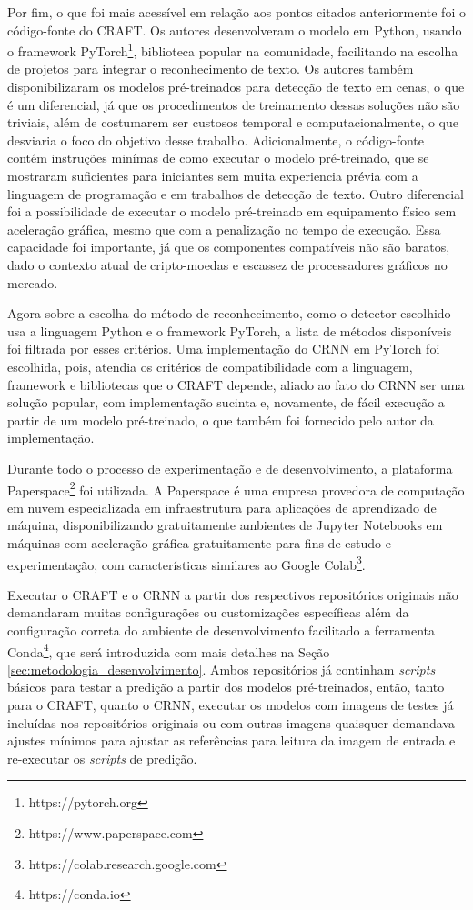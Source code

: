 Por fim, o que foi mais acessível em relação aos pontos citados anteriormente foi o código-fonte do CRAFT. Os autores desenvolveram o modelo em 
Python, usando o framework PyTorch\footnote{https://pytorch.org}, biblioteca popular na comunidade, facilitando na escolha de projetos para 
integrar o reconhecimento de texto. Os autores também disponibilizaram os modelos pré-treinados para detecção de texto em cenas, o que é um diferencial, 
já que os procedimentos de treinamento dessas soluções não são triviais, além de costumarem ser custosos temporal e computacionalmente, o que desviaria o foco do objetivo desse trabalho. 
Adicionalmente, o código-fonte contém instruções minímas de como executar o modelo pré-treinado, que se mostraram suficientes para iniciantes 
sem muita experiencia prévia com a linguagem de programação e em trabalhos de detecção de texto. Outro diferencial foi a possibilidade de executar 
o modelo pré-treinado em equipamento físico sem aceleração gráfica, mesmo que com a penalização no tempo de execução. 
Essa capacidade foi importante, já que os componentes compatíveis não são baratos, dado o contexto atual de cripto-moedas e escassez de processadores gráficos no mercado.

Agora sobre a escolha do método de reconhecimento, como o detector escolhido usa a linguagem Python e o framework PyTorch, a lista de métodos 
disponíveis foi filtrada por esses critérios. Uma implementação do CRNN em PyTorch foi escolhida, pois, atendia os critérios de compatibilidade 
com a linguagem, framework e bibliotecas que o CRAFT depende, aliado ao fato do CRNN ser uma solução popular, com implementação sucinta e, 
novamente, de fácil execução a partir de um modelo pré-treinado, o que também foi fornecido pelo autor da implementação.

Durante todo o processo de experimentação e de desenvolvimento, a plataforma Paperspace\footnote{https://www.paperspace.com} foi utilizada. 
A Paperspace é uma empresa provedora de computação em nuvem especializada em infraestrutura para aplicações de aprendizado de máquina, disponibilizando 
gratuitamente ambientes de Jupyter Notebooks em máquinas com aceleração gráfica gratuitamente para fins de estudo e experimentação, com características 
similares ao Google Colab\footnote{https://colab.research.google.com}.

Executar o CRAFT e o CRNN a partir dos respectivos repositórios originais não demandaram muitas configurações ou customizações específicas além da 
configuração correta do ambiente de desenvolvimento facilitado a ferramenta Conda\footnote{https://conda.io}, que será introduzida com mais detalhes na Seção \ref{sec:metodologia_desenvolvimento}.
Ambos repositórios já continham \textit{scripts} básicos para testar a predição a partir dos modelos pré-treinados, então, tanto para o CRAFT, 
quanto o CRNN, executar os modelos com imagens de testes já incluídas nos repositórios originais ou com outras imagens quaisquer demandava ajustes 
mínimos para ajustar as referências para leitura da imagem de entrada e re-executar os \textit{scripts} de predição.

